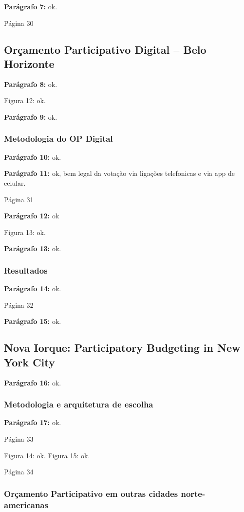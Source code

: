 \documentclass[12pt]{report}
\newcommand{\pp}[1]{

\textbf{Parágrafo #1:}
}
\begin{document}
\pp{7} ok.

\noindent Página 30

\subsection{Orçamento Participativo Digital – Belo Horizonte}

\pp{8} ok.

Figura 12: ok.

\pp{9} ok.

\subsubsection{Metodologia do OP Digital}

\pp{10} ok.

\pp{11} ok, bem legal da votação via ligações telefonicas e via app de celular.

\noindent Página 31

\pp{12} ok

Figura 13: ok.

\pp{13} ok.

\subsubsection{Resultados}

\pp{14} ok.

\noindent Página 32

\pp{15} ok.

\subsection{Nova Iorque: Participatory Budgeting in New York City}

\pp{16} ok.

\subsubsection{Metodologia e arquitetura de escolha}

\pp{17} ok.

\noindent Página 33

Figura 14: ok.
Figura 15: ok.

\noindent Página 34

\subsubsection{Orçamento Participativo em outras cidades norte-americanas}
\end{document}
